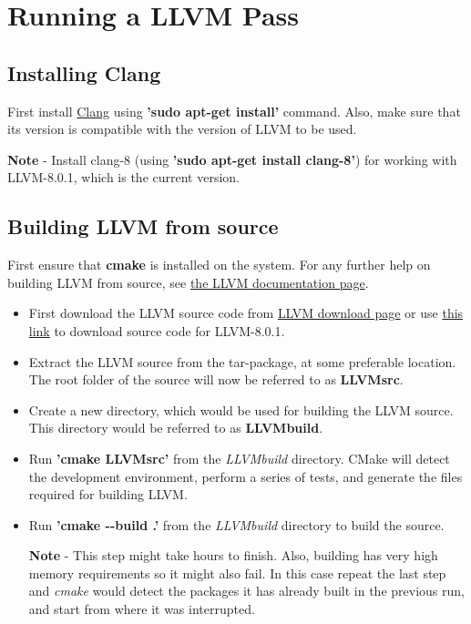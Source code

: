 \chapter{Running a LLVM Pass}
\label{chap:chapter6}

\section{Installing Clang}
\label{InstallClang}
First install \href{https://clang.llvm.org/}{Clang} using 
\textbf{'sudo apt-get install'} command. Also, make sure that its 
version is compatible with the version of LLVM to be used.

\textbf{Note} - Install clang-8 (using \textbf{'sudo apt-get install 
clang-8'}) for working with LLVM-8.0.1, which is the current version.


\section{Building LLVM from source}
\label{BuildLLVM}

First ensure that \textbf{cmake} is installed on the system. For any 
further help on building LLVM from source, see 
\href{https://llvm.org/docs/CMake.html}{the LLVM documentation page}.

\begin{itemize}
    \item First download the LLVM source code from 
    \href{http://releases.llvm.org/download.html}{LLVM download page} 
    or use \href{https://github.com/llvm/llvm-project/releases/download/llvmorg-8.0.1/llvm-8.0.1.src.tar.xz}{this link}
    to download source code for LLVM-8.0.1. 
    \item Extract the LLVM source from the tar-package, at some 
    preferable location. The root folder of the source will now be 
    referred to as \textbf{LLVMsrc}.
    \item Create a new directory, which would be used for building 
    the LLVM source. This directory would be referred to as 
    \textbf{LLVMbuild}.
    \item Run \textbf{'cmake LLVMsrc'} from the \textit{LLVMbuild} 
    directory. CMake will detect the development environment, perform 
    a series of tests, and generate the files required for building 
    LLVM. 
    \item Run \textbf{'cmake -{}-build .'} from the \textit{LLVMbuild}
    directory to build the source.

    \textbf{Note} - This step might take hours to finish. Also, 
    building has very high memory requirements so it might also fail. 
    In this case repeat the last step and \textit{cmake} would detect 
    the packages it has already built in the previous run, and start 
    from where it was interrupted.
\end{itemize}
        
